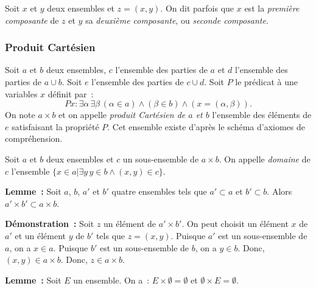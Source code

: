 \medskip

Soit $x$ et $y$ deux ensembles et $z = (x,y)$. 
On dit parfois que $x$ est la \textit{première composante} de $z$ et $y$ sa \textit{deuxième composante}, ou \textit{seconde composante}.

\subsubsection{Produit Cartésien}

Soit $a$ et $b$ deux ensembles, $c$ l'ensemble des parties de $a$ et $d$ l'ensemble des parties de $a \cup b$. 
Soit $e$ l'ensemble des parties de $c \cup d$. 
Soit $P$ le prédicat à une variables $x$ définit par : 
\begin{equation*}
    P x: \exists \alpha \, \exists \beta \, (\alpha \in a) \wedge (\beta \in b) \wedge (x = (\alpha, \beta)).
\end{equation*}
On note $a \times b$ et on appelle \textit{produit Cartésien de $a$ et $b$} l'ensemble des éléments de $e$ satisfaisant la propriété $P$. 
Cet ensemble existe d'après le schéma d'axiomes de compréhension. 

Soit $a$ et $b$ deux ensembles et $c$ un sous-ensemble de $a \times b$. 
On appelle \textit{domaine} de $c$ l'ensemble $\lbrace x \in a \vert \exists y \, y \in b \wedge (x,y) \in c \rbrace$. 

\medskip

\noindent\textbf{Lemme :} Soit $a$, $b$, $a'$ et $b'$ quatre ensembles tels que $a' \subset a$ et $b' \subset b$. 
    Alors $a' \times b' \subset a \times b$.

\medskip

\noindent\textbf{Démonstration :}
    Soit $z$ un élément de $a' \times b'$. 
    On peut choisit un élément $x$ de $a'$ et un élément $y$ de $b'$ tels que $z = (x,y)$.
    Puisque $a'$ est un sous-ensemble de $a$, on a $x \in a$.
    Puisque $b'$ est un sous-ensemble de $b$, on a $y \in b$. 
    Donc, $(x,y) \in a \times b$.
    Donc, $z \in a \times b$.

   \done 

\medskip

\noindent\textbf{Lemme :} Soit $E$ un ensemble. 
    On a : $E \times \emptyset = \emptyset$ et $\emptyset \times E = \emptyset$.

\medskip

